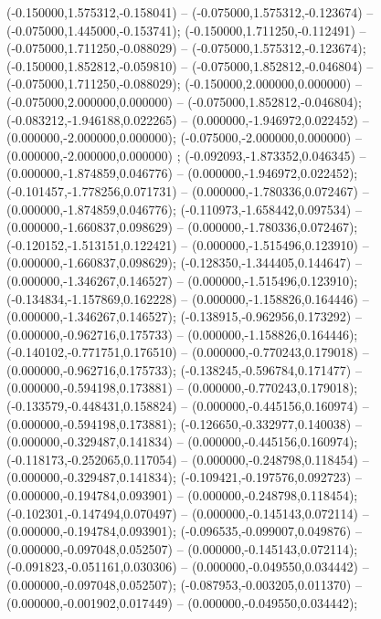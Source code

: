  (-0.150000,1.575312,-0.158041) -- (-0.075000,1.575312,-0.123674) -- (-0.075000,1.445000,-0.153741);
 (-0.150000,1.711250,-0.112491) -- (-0.075000,1.711250,-0.088029) -- (-0.075000,1.575312,-0.123674);
 (-0.150000,1.852812,-0.059810) -- (-0.075000,1.852812,-0.046804) -- (-0.075000,1.711250,-0.088029);
 (-0.150000,2.000000,0.000000) -- (-0.075000,2.000000,0.000000) -- (-0.075000,1.852812,-0.046804);
 (-0.083212,-1.946188,0.022265) -- (0.000000,-1.946972,0.022452) -- (0.000000,-2.000000,0.000000);
 (-0.075000,-2.000000,0.000000) -- (0.000000,-2.000000,0.000000) ;
 (-0.092093,-1.873352,0.046345) -- (0.000000,-1.874859,0.046776) -- (0.000000,-1.946972,0.022452);
 (-0.101457,-1.778256,0.071731) -- (0.000000,-1.780336,0.072467) -- (0.000000,-1.874859,0.046776);
 (-0.110973,-1.658442,0.097534) -- (0.000000,-1.660837,0.098629) -- (0.000000,-1.780336,0.072467);
 (-0.120152,-1.513151,0.122421) -- (0.000000,-1.515496,0.123910) -- (0.000000,-1.660837,0.098629);
 (-0.128350,-1.344405,0.144647) -- (0.000000,-1.346267,0.146527) -- (0.000000,-1.515496,0.123910);
 (-0.134834,-1.157869,0.162228) -- (0.000000,-1.158826,0.164446) -- (0.000000,-1.346267,0.146527);
 (-0.138915,-0.962956,0.173292) -- (0.000000,-0.962716,0.175733) -- (0.000000,-1.158826,0.164446);
 (-0.140102,-0.771751,0.176510) -- (0.000000,-0.770243,0.179018) -- (0.000000,-0.962716,0.175733);
 (-0.138245,-0.596784,0.171477) -- (0.000000,-0.594198,0.173881) -- (0.000000,-0.770243,0.179018);
 (-0.133579,-0.448431,0.158824) -- (0.000000,-0.445156,0.160974) -- (0.000000,-0.594198,0.173881);
 (-0.126650,-0.332977,0.140038) -- (0.000000,-0.329487,0.141834) -- (0.000000,-0.445156,0.160974);
 (-0.118173,-0.252065,0.117054) -- (0.000000,-0.248798,0.118454) -- (0.000000,-0.329487,0.141834);
 (-0.109421,-0.197576,0.092723) -- (0.000000,-0.194784,0.093901) -- (0.000000,-0.248798,0.118454);
 (-0.102301,-0.147494,0.070497) -- (0.000000,-0.145143,0.072114) -- (0.000000,-0.194784,0.093901);
 (-0.096535,-0.099007,0.049876) -- (0.000000,-0.097048,0.052507) -- (0.000000,-0.145143,0.072114);
 (-0.091823,-0.051161,0.030306) -- (0.000000,-0.049550,0.034442) -- (0.000000,-0.097048,0.052507);
 (-0.087953,-0.003205,0.011370) -- (0.000000,-0.001902,0.017449) -- (0.000000,-0.049550,0.034442);
